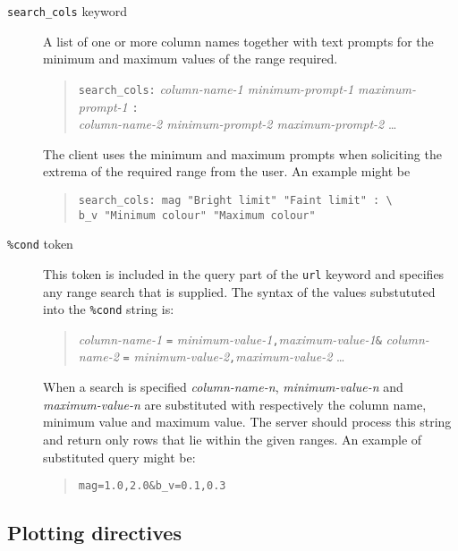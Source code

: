 \documentclass[twoside,11pt,nolof,chapters]{starlink}
\begin{document}
\begin{description}

  \item[\texttt{search\_cols} keyword] A list of one or more column names
   together with text prompts for the minimum and maximum values of the
   range required.

  \begin{quote}
   \texttt{search\_cols:} \textit{column-name-1 minimum-prompt-1 maximum-prompt-1}
   \texttt{:} \\
   \textit{column-name-2 minimum-prompt-2 maximum-prompt-2} \ldots
  \end{quote}

   The client uses the minimum and maximum prompts when soliciting the
   extrema of the required range from the user.  An example might be

  \begin{quote}
   \texttt{search\_cols: mag "Bright limit" "Faint limit" : \texttt{\textbackslash} \\
   b\_v "Minimum colour" "Maximum colour"}
  \end{quote}

  \item[\texttt{\%cond} token] This token is included in the query part
   of the \texttt{url} keyword and specifies any range search that is
   supplied.  The syntax of the values substututed into the \texttt{\%cond}
   string is:

  \begin{quote}
   \textit{column-name-1}\/ \texttt{=} \textit{minimum-value-1}\texttt{,}\textit{maximum-value-1}\texttt{\&}
   \textit{column-name-2}\/ \texttt{=} \textit{minimum-value-2}\texttt{,}\textit{maximum-value-2} \ldots
  \end{quote}

   When a search is specified \textit{column-name-n}, \textit{minimum-value-n}\/
   and  \textit{maximum-value-n}\/ are substituted with respectively the column
   name, minimum value and maximum value.  The server should process this
   string and return only rows that lie within the given ranges.  An
   example of substituted query might be:

  \begin{quote}
   \texttt{mag=1.0,2.0\&b\_v=0.1,0.3}
  \end{quote}

\end{description}

\subsection{\label{PLOTTING_R}Plotting directives}
\end{document}

